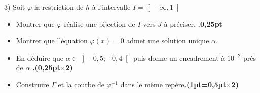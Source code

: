 \documentclass[12pt]{article}
\begin{document}
3) Soit $\varphi$ la restriction de $h$ à l’intervalle $I=\left]-\infty, 1\right[ $
\begin{itemize}    
    \item[a)]  Montrer que $\varphi$  réalise une bijection de $I$ vers $J$  à préciser.
    \textbf{.0,25pt}
        
    \item[b)]  Montrer que l’équation $\varphi(x)=0$ admet une solution unique $\alpha$.\\
    \item[] En déduire que $\alpha \in \left]-0,5 ; -0,4 \right[ $ puis donne un encadrement à $10^{-2}$ prés de $\alpha$ \textbf{.(0,25pt$\times$2)}
    
    \item[c)]  Construire $\Gamma$ et la courbe de $\varphi^{-1}$  dans le même repère\textbf{.(1pt=0,5pt$\times$2)}
\end{itemize}
\end{document}

